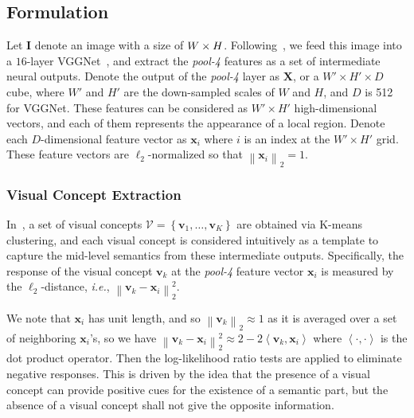 \documentclass[10pt,twocolumn,letterpaper]{article}
\begin{document}
  \subsection{Formulation}
  \label{Framework:Formulation}

  Let $\mathbf{I}$ denote an image with a size of $W\times H \time 3$. Following~\cite{wang2017detecting}, we feed this image into a $16$-layer VGGNet~\cite{Simonyan_2015_Very}, and extract the {\em pool-4} features as a set of intermediate neural outputs. Denote the output of the {\em pool-4} layer as $\mathbf{X}$, or a $W'\times H'\times D$ cube, where $W'$ and $H'$ are the down-sampled scales of $W$ and $H$, and ${D}$ is 512 for VGGNet. These features can be considered as $W'\times H'$ high-dimensional vectors, and each of them represents the appearance of a local region. Denote each $D$-dimensional feature vector as $\mathbf{x}_i$ where $i$ is an index at the $W'\times H'$ grid. These feature vectors are $\ell_2$-normalized so that ${\left\|\mathbf{x}_i\right\|_2}={1}$.


  \subsubsection{Visual Concept Extraction}
  \label{Framework:Formulation:Extraction}

  In~\cite{wang2017detecting}, a set of visual concepts ${\mathcal{V}}={\left\{\mathbf{v}_1,\ldots,\mathbf{v}_K\right\}}$ are obtained via K-means clustering, and each visual concept is considered intuitively as a template to capture the mid-level semantics from these intermediate outputs. Specifically, the response of the visual concept $\mathbf{v}_k$ at the {\em pool-4} feature vector $\mathbf{x}_i$ is measured by the $\ell_2$-distance, {\em i.e.}, $\left\|\mathbf{v}_k-\mathbf{x}_i\right\|_2^2$.

  We note that $\mathbf{x}_i$ has unit length, and so ${\left\|\mathbf{v}_k\right\|_2}\approx{1}$ as it is averaged over a set of neighboring $\mathbf{x}_i$'s, so we have ${\left\|\mathbf{v}_k-\mathbf{x}_i\right\|_2^2}\approx{2-2\left\langle\mathbf{v}_k,\mathbf{x}_i\right\rangle}$ where $\left\langle\cdot,\cdot\right\rangle$ is the dot product operator. Then the log-likelihood ratio tests are applied to eliminate negative responses. This is driven by the idea that the presence of a visual concept can provide positive cues for the existence of a semantic part, but the absence of a visual concept shall not give the opposite information.
\end{document}
